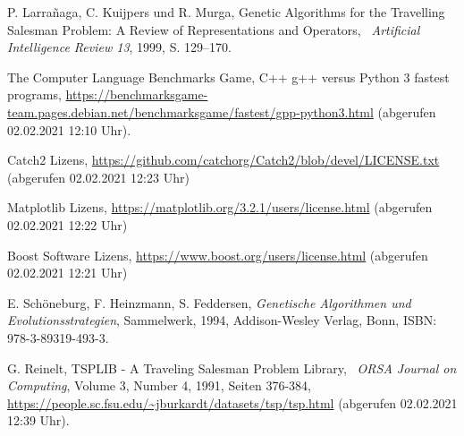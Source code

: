 
\begin{thebibliography}{99}
	P. Larrañaga, C. Kuijpers und R. Murga,
	\glqq Genetic Algorithms for the Travelling Salesman Problem: A Review of Representations and Operators,\grqq 
	\ \textit{Artificial Intelligence Review 13}, 1999, S. 129–170.

	The Computer Language Benchmarks Game,
	C++ g++ versus Python 3 fastest programs,
	\url{https://benchmarksgame-team.pages.debian.net/benchmarksgame/fastest/gpp-python3.html} (abgerufen 02.02.2021 12:10 Uhr).

	Catch2 Lizens,
	\url{https://github.com/catchorg/Catch2/blob/devel/LICENSE.txt} (abgerufen 02.02.2021 12:23 Uhr)

	Matplotlib Lizens,
	\url{https://matplotlib.org/3.2.1/users/license.html} (abgerufen 02.02.2021 12:22 Uhr)

	Boost Software Lizens,
	\url{https://www.boost.org/users/license.html} (abgerufen 02.02.2021 12:21 Uhr)

	E. Schöneburg, F. Heinzmann, S. Feddersen,
	\emph{Genetische Algorithmen und Evolutionsstrategien},
	Sammelwerk, 1994, Addison-Wesley Verlag, Bonn, ISBN: 978-3-89319-493-3.

	G. Reinelt,
	\glqq TSPLIB - A Traveling Salesman Problem Library,\grqq 
	\ \textit{ORSA Journal on Computing},
	Volume 3, Number 4, 1991, Seiten 376-384,
	\url{https://people.sc.fsu.edu/~jburkardt/datasets/tsp/tsp.html} (abgerufen 02.02.2021 12:39 Uhr).
	
	
\end{thebibliography}

